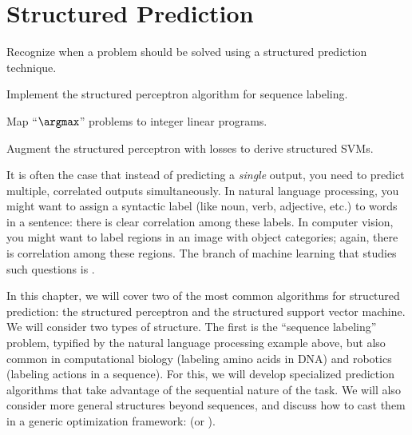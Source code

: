 \chapter{Structured Prediction} \label{sec:srl}


\begin{learningobjectives}
\item Recognize when a problem should be solved using a structured prediction technique.
\item Implement the structured perceptron algorithm for sequence labeling.
\item Map ``$\argmax$'' problems to integer linear programs.
\item Augment the structured perceptron with losses to derive structured SVMs.
\end{learningobjectives}

\dependencies{}

It is often the case that instead of predicting a \emph{single} output, you need to predict multiple, correlated outputs simultaneously.
In natural language processing, you might want to assign a syntactic label (like noun, verb, adjective, etc.) to words in a sentence: there is clear correlation among these labels.
In computer vision, you might want to label regions in an image with object categories; again, there is correlation among these regions.
The branch of machine learning that studies such questions is .

In this chapter, we will cover two of the most common algorithms for structured prediction: the structured perceptron and the structured support vector machine.
We will consider two types of structure.
The first is the ``sequence labeling'' problem, typified by the natural language processing example above, but also common in computational biology (labeling amino acids in DNA) and robotics (labeling actions in a sequence).
For this, we will develop specialized prediction algorithms that take advantage of the sequential nature of the task.
We will also consider more general structures beyond sequences, and discuss how to cast them in a generic optimization framework:  (or ).

